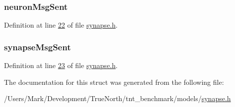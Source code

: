 \subsubsection[{neuron\+Msg\+Sent}]{ neuron\+Msg\+Sent}\label{structsynapse_state_a9e389b0b50f9ec5e3f5b7b0f5383d6d5}


Definition at line \hyperlink{synapse_8h_source_l00022}{22} of file \hyperlink{synapse_8h_source}{synapse.\+h}.

\hypertarget{structsynapse_state_a3fd766946f24d2fd6a2021ec24939284}{}
\subsubsection[{synapse\+Msg\+Sent}]{ synapse\+Msg\+Sent}\label{structsynapse_state_a3fd766946f24d2fd6a2021ec24939284}


Definition at line \hyperlink{synapse_8h_source_l00023}{23} of file \hyperlink{synapse_8h_source}{synapse.\+h}.



The documentation for this struct was generated from the following file\+:\begin{DoxyCompactItemize}
\item 
/\+Users/\+Mark/\+Development/\+True\+North/tnt\+\_\+benchmark/models/\hyperlink{synapse_8h}{synapse.\+h}\end{DoxyCompactItemize}
